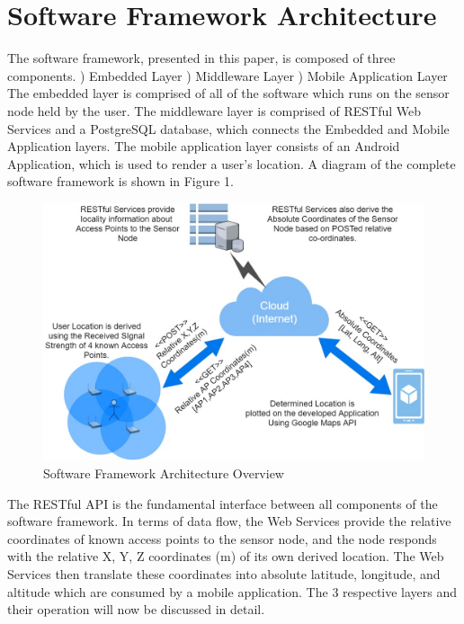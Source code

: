 \documentclass[conference]{IEEEtran}
\begin{document}
\section{Software Framework Architecture}
The software framework, presented in this paper, is composed of three components.
) Embedded Layer
) Middleware Layer
) Mobile Application Layer
\newline
The embedded layer is comprised of all of the software which runs on the sensor node held by the user.
The middleware layer is comprised of RESTful Web Services and a PostgreSQL database, which connects the Embedded and Mobile Application layers.
The mobile application layer consists of an Android Application, which is used to render a user's location.
A diagram of the complete software framework is shown in Figure 1.
\begin{figure}[H]
    \includegraphics[width=9 cm,height=5.5 cm]{System_Diagram.jpg}
    \caption{Software Framework Architecture Overview}
    \end{figure}
The RESTful API is the fundamental interface between all components of the software framework. In terms of data flow, the Web Services provide the relative coordinates of known access points to the sensor node, and the node responds with the relative X, Y, Z coordinates (m) of its own derived location. The Web Services then translate these coordinates into absolute latitude, longitude, and altitude which are consumed by a mobile application.
The 3 respective layers and their operation will now be discussed in detail.
\end{document}
